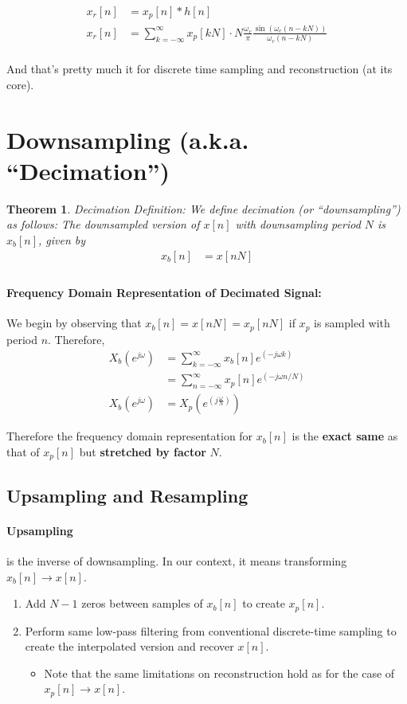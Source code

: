 \documentclass[a4paper,12pt]{report}
\newtheorem{theorem}{Theorem}
\begin{document}
\begin{align}
x_r[n] &= x_p[n] * h[n] \\
x_r[n] &= \sum_{k=-\infty}^{\infty} x_p[kN] \cdot N \frac{\omega_c}{\pi} \frac{\sin(\omega_c(n-kN))}{\omega_c(n-kN)} \\
\end{align}

And that's pretty much it for discrete time sampling and reconstruction (at its core).



\section{Downsampling (a.k.a. ``Decimation'')}

\begin{theorem}{Decimation Definition: }
We define decimation (or ``downsampling'') as follows: The downsampled version of $x[n]$ with downsampling period $N$ is $x_b[n]$, given by 
\begin{align}
x_b[n] &= x[nN] \\
\end{align}
\end{theorem}


\paragraph{Frequency Domain Representation of Decimated Signal: } We begin by observing that $x_b[n] = x[nN] = x_p[nN]$ if $x_p$ is sampled with period $n$. Therefore, 
\begin{align}
X_b(e^{j\omega}) &= \sum_{k=-\infty}^{\infty} x_b[n] e^{(-j\omega k)} \\
&= \sum_{n=-\infty}^{\infty} x_p[n] e^{(-j\omega n/N)}  \\
X_b(e^{j\omega}) &= X_p(e^{(j\frac{\omega}{N})}) 
\end{align}

Therefore the frequency domain representation for $x_b[n]$ is the \textbf{exact same} as that of $x_p[n]$ but \textbf{stretched by factor} $N$.

\subsection{Upsampling and Resampling}

\paragraph{Upsampling} is the inverse of downsampling. In our context, it means transforming $x_b[n] \to x[n]$. 
\begin{enumerate}
\item Add $N-1$ zeros between samples of $x_b[n]$ to create $x_p[n]$.
\item Perform same low-pass filtering from conventional discrete-time sampling to create the interpolated version and recover $x[n]$. 
\begin{itemize}
\item Note that the same limitations on reconstruction hold as for the case of $x_p[n] \to x[n]$. 
\end{itemize}
\end{enumerate}
\end{document}
